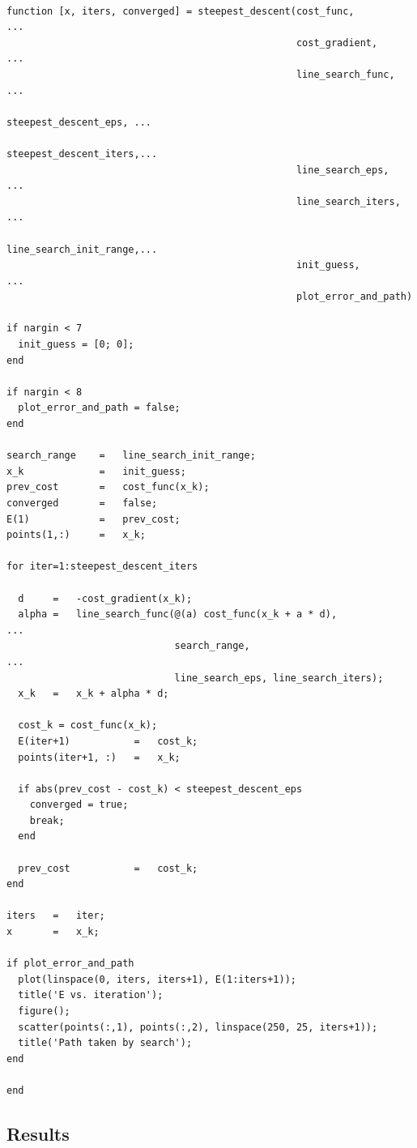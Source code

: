 \documentclass{article}
\begin{document}
\begin{lstlisting}

function [x, iters, converged] = steepest_descent(cost_func,            ...
                                                  cost_gradient,        ...
                                                  line_search_func,     ...
                                                  steepest_descent_eps, ...
                                                  steepest_descent_iters,...
                                                  line_search_eps,      ...
                                                  line_search_iters,    ...
                                                  line_search_init_range,...
                                                  init_guess,           ...
                                                  plot_error_and_path)

if nargin < 7
  init_guess = [0; 0];
end

if nargin < 8
  plot_error_and_path = false;
end

search_range    =   line_search_init_range;
x_k             =   init_guess;
prev_cost       =   cost_func(x_k);
converged       =   false;
E(1)            =   prev_cost;
points(1,:)     =   x_k;

for iter=1:steepest_descent_iters

  d     =   -cost_gradient(x_k);
  alpha =   line_search_func(@(a) cost_func(x_k + a * d),           ...
                             search_range,                          ...
                             line_search_eps, line_search_iters);
  x_k   =   x_k + alpha * d;
  
  cost_k = cost_func(x_k);
  E(iter+1)           =   cost_k;
  points(iter+1, :)   =   x_k;
  
  if abs(prev_cost - cost_k) < steepest_descent_eps
    converged = true;
    break;
  end
  
  prev_cost           =   cost_k;
end

iters   =   iter;
x       =   x_k;

if plot_error_and_path
  plot(linspace(0, iters, iters+1), E(1:iters+1));
  title('E vs. iteration');
  figure();
  scatter(points(:,1), points(:,2), linspace(250, 25, iters+1));
  title('Path taken by search');
end

end

\end{lstlisting}

\subsection{Results}
\end{document}
